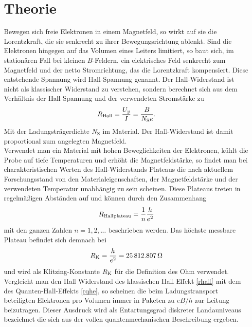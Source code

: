 \documentclass[paper=a4,fontsize=10pt,DIV=18,twocolumn,parskip=half]{scrartcl}
\numberwithin{equation}{section}    %
\begin{document}
%
\section{Theorie}
\label{Theorie}
\label{theorie}
Bewegen sich freie Elektronen in einem Magnetfeld, so wirkt auf sie die Lorentzkraft, die sie senkrecht zu ihrer Bewegungsrichtung ablenkt. Sind die Elektronen hingegen auf das Volumen eines Leiters limitiert, so baut sich, im stationären Fall bei kleinen $B$-Feldern, ein elektrisches Feld senkrecht zum Magnetfeld und der netto Stromrichtung, das die Lorentzkraft kompensiert. Diese entstehende Spannung  wird Hall-Spannung genannt. Der Hall-Widerstand ist nicht als klassischer Widerstand zu verstehen, sondern berechnet sich aus dem Verhältnis der Hall-Spannung und der verwendeten Stromstärke zu
\begin{equation}
R_{\rm Hall}=\frac{U_y}{I}=\frac{B}{N_\mathrm{S} e}.
\label{rhall}
\end{equation}
Mit der Ladungsträgerdichte $N_\mathrm{S}$ im Material. Der Hall-Widerstand ist damit proportional zum angelegten Magnetfeld. \\
Verwendet man ein Material mit hohen Beweglichkeiten der Elektronen, kühlt die Probe auf tiefe Temperaturen und erhöht die Magnetfeldstärke, so findet man bei charakteristischen Werten des Hall-Widerstands Plateaus die nach aktuellem Forschungsstand von den Materialeigenschaften, der Magnetfeldstärke und der verwendeten Temperatur unabhängig zu sein scheinen.
Diese Plateaus treten in regelmäßigen Abständen auf und können durch den Zusammenhang 
\begin{equation}
R_{\rm Hallplateau}=\frac{1}{n} \frac{h}{e^2} 
\label{rqhe}
\end{equation}
mit den ganzen Zahlen $n=1,2,...$ beschrieben werden.  Das höchste messbare Plateau befindet sich demnach bei 
\begin{equation}
R_{\rm K}=\frac{h}{e^2}= \SI{25812.807}{\ohm}
\end{equation}
und wird als Klitzing-Konstante $R_{\rm K}$ für die Definition des Ohm verwendet.\\
Vergleicht man den Hall-Widerstand des klassischen Hall-Effekt \ref{rhall} mit dem des Quanten-Hall-Effekts \ref{rqhe}, so scheinen die beim Ladungstransport beteiligten Elektronen pro Volumen immer in Paketen zu $e B/h$ zur Leitung beizutragen. Dieser Ausdruck wird als Entartungsgrad diskreter Landauniveaus bezeichnet die sich aus der vollen quantenmechanischen Beschreibung ergeben.
\end{document}
